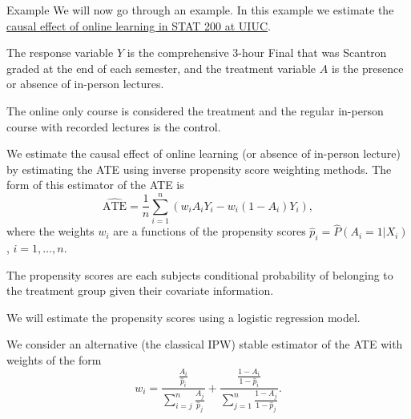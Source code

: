 \documentclass[
  ignorenonframetext,
]{beamer}
\begin{document}
\begin{frame}{Example}
\protect\hypertarget{example}{}
We will now go through an example. In this example we estimate the
\href{https://arxiv.org/abs/2101.06755}{causal effect of online learning
in STAT 200 at UIUC}.

\vspace{12pt}

The response variable \(Y\) is the comprehensive 3-hour Final that was
Scantron graded at the end of each semester, and the treatment variable
\(A\) is the presence or absence of in-person lectures.

\vspace{12pt}

The online only course is considered the treatment and the regular
in-person course with recorded lectures is the control.
\end{frame}

\begin{frame}{}
\protect\hypertarget{section-13}{}
We estimate the causal effect of online learning (or absence of
in-person lecture) by estimating the ATE using inverse propensity score
weighting methods. The form of this estimator of the ATE is \[
 \widehat{\text{ATE}} = \frac{1}{n}\sum_{i=1}^n \left(w_iA_iY_i - w_i(1-A_i)Y_i\right),
\] where the weights \(w_i\) are a functions of the propensity scores
\(\hat{p}_i = \widehat{P}(A_i = 1|X_i)\), \(i = 1,\ldots,n\).

\vspace{12pt}

The propensity scores are each subjects conditional probability of
belonging to the treatment group given their covariate information.

\vspace{12pt}

We will estimate the propensity scores using a logistic regression
model.
\end{frame}

\begin{frame}{}
\protect\hypertarget{section-14}{}
We consider an alternative (the classical IPW) stable estimator of the
ATE with weights of the form \[
  w_i = \frac{\frac{A_i}{\hat{p}_i}}{\sum_{i=j}^n\frac{A_j}{\hat{p}_j}} + \frac{\frac{1-A_i}{1 -\hat{p}_i}}{\sum_{j=1}^n\frac{1-A_j}{1-\hat{p}_j}}.
\]
\end{frame}
\end{document}
